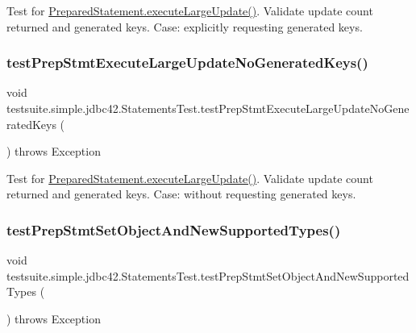 Test for \mbox{\hyperlink{classcom_1_1mysql_1_1jdbc_1_1_prepared_statement_a9db54f06b57ab9446798d306d59aeefc}{Prepared\+Statement.\+execute\+Large\+Update()}}. Validate update count returned and generated keys. Case\+: explicitly requesting generated keys. \mbox{\label{classtestsuite_1_1simple_1_1jdbc42_1_1_statements_test_a2629615e573805e4404fa4dc622627d7}} 
\subsubsection{\texorpdfstring{test\+Prep\+Stmt\+Execute\+Large\+Update\+No\+Generated\+Keys()}{testPrepStmtExecuteLargeUpdateNoGeneratedKeys()}}
{\footnotesize\ttfamily void testsuite.\+simple.\+jdbc42.\+Statements\+Test.\+test\+Prep\+Stmt\+Execute\+Large\+Update\+No\+Generated\+Keys (\begin{DoxyParamCaption}{ }\end{DoxyParamCaption}) throws Exception}

Test for \mbox{\hyperlink{classcom_1_1mysql_1_1jdbc_1_1_prepared_statement_a9db54f06b57ab9446798d306d59aeefc}{Prepared\+Statement.\+execute\+Large\+Update()}}. Validate update count returned and generated keys. Case\+: without requesting generated keys. \mbox{\label{classtestsuite_1_1simple_1_1jdbc42_1_1_statements_test_a169f954f7f0fce6437936d4f55350cef}} 
\subsubsection{\texorpdfstring{test\+Prep\+Stmt\+Set\+Object\+And\+New\+Supported\+Types()}{testPrepStmtSetObjectAndNewSupportedTypes()}}
{\footnotesize\ttfamily void testsuite.\+simple.\+jdbc42.\+Statements\+Test.\+test\+Prep\+Stmt\+Set\+Object\+And\+New\+Supported\+Types (\begin{DoxyParamCaption}{ }\end{DoxyParamCaption}) throws Exception}


